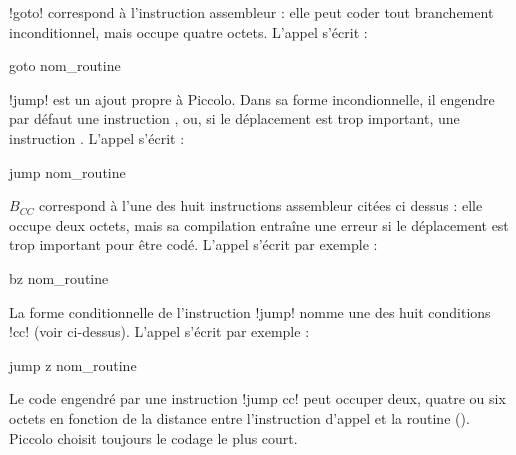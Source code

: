 \pic!goto! correspond à l’instruction assembleur  : elle peut coder tout branchement inconditionnel, mais occupe quatre octets. L'appel s'écrit :
\begin{piccolo}
goto nom_routine
\end{piccolo}


\pic!jump! est un ajout propre à Piccolo. Dans sa forme incondionnelle, il engendre par défaut une instruction , ou, si le déplacement est trop important, une instruction . L'appel s'écrit :
\begin{piccolo}
jump nom_routine
\end{piccolo}

$B_{CC}$ correspond à l’une des huit instructions assembleur citées ci dessus : elle occupe deux octets, mais sa compilation entraîne une erreur si le déplacement est trop important pour être codé. L'appel s'écrit par exemple :
\begin{piccolo}
bz nom_routine
\end{piccolo}


La forme conditionnelle de l'instruction \pic!jump! nomme une des huit conditions \pic!cc! (voir ci-dessus). L'appel s'écrit par exemple :
\begin{piccolo}
jump z nom_routine
\end{piccolo}

Le code engendré par une instruction \pic!jump cc! peut occuper deux, quatre ou six octets en fonction de la distance entre l'instruction d'appel et la routine (). Piccolo choisit toujours le codage le plus court. 



